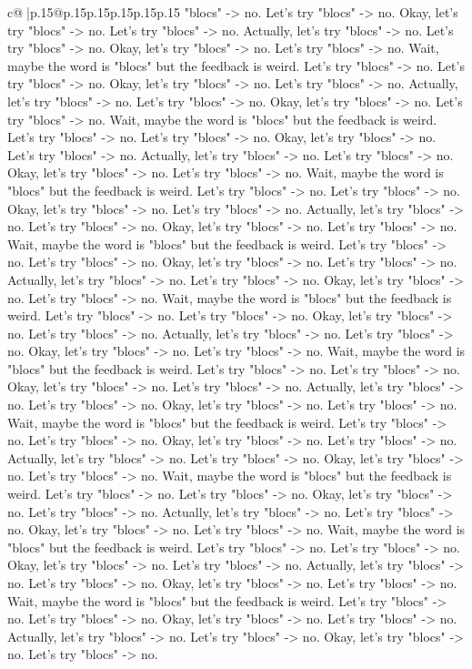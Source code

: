 \documentclass{article}
\begin{document}
{\begin{supertabular}{c@{$\;$}|p{.15\linewidth}@{}p{.15\linewidth}p{.15\linewidth}p{.15\linewidth}p{.15\linewidth}p{.15\linewidth}}
{{{"blocs" {-}> no. Let's try "blocs" {-}> no. Okay, let's try "blocs" {-}> no. Let's try "blocs" {-}> no. Actually, let's try "blocs" {-}> no. Let's try "blocs" {-}> no. Okay, let's try "blocs" {-}> no. Let's try "blocs" {-}> no. Wait, maybe the word is "blocs" but the feedback is weird. Let's try "blocs" {-}> no. Let's try "blocs" {-}> no. Okay, let's try "blocs" {-}> no. Let's try "blocs" {-}> no. Actually, let's try "blocs" {-}> no. Let's try "blocs" {-}> no. Okay, let's try "blocs" {-}> no. Let's try "blocs" {-}> no. Wait, maybe the word is "blocs" but the feedback is weird. Let's try "blocs" {-}> no. Let's try "blocs" {-}> no. Okay, let's try "blocs" {-}> no. Let's try "blocs" {-}> no. Actually, let's try "blocs" {-}> no. Let's try "blocs" {-}> no. Okay, let's try "blocs" {-}> no. Let's try "blocs" {-}> no. Wait, maybe the word is "blocs" but the feedback is weird. Let's try "blocs" {-}> no. Let's try "blocs" {-}> no. Okay, let's try "blocs" {-}> no. Let's try "blocs" {-}> no. Actually, let's try "blocs" {-}> no. Let's try "blocs" {-}> no. Okay, let's try "blocs" {-}> no. Let's try "blocs" {-}> no. Wait, maybe the word is "blocs" but the feedback is weird. Let's try "blocs" {-}> no. Let's try "blocs" {-}> no. Okay, let's try "blocs" {-}> no. Let's try "blocs" {-}> no. Actually, let's try "blocs" {-}> no. Let's try "blocs" {-}> no. Okay, let's try "blocs" {-}> no. Let's try "blocs" {-}> no. Wait, maybe the word is "blocs" but the feedback is weird. Let's try "blocs" {-}> no. Let's try "blocs" {-}> no. Okay, let's try "blocs" {-}> no. Let's try "blocs" {-}> no. Actually, let's try "blocs" {-}> no. Let's try "blocs" {-}> no. Okay, let's try "blocs" {-}> no. Let's try "blocs" {-}> no. Wait, maybe the word is "blocs" but the feedback is weird. Let's try "blocs" {-}> no. Let's try "blocs" {-}> no. Okay, let's try "blocs" {-}> no. Let's try "blocs" {-}> no. Actually, let's try "blocs" {-}> no. Let's try "blocs" {-}> no. Okay, let's try "blocs" {-}> no. Let's try "blocs" {-}> no. Wait, maybe the word is "blocs" but the feedback is weird. Let's try "blocs" {-}> no. Let's try "blocs" {-}> no. Okay, let's try "blocs" {-}> no. Let's try "blocs" {-}> no. Actually, let's try "blocs" {-}> no. Let's try "blocs" {-}> no. Okay, let's try "blocs" {-}> no. Let's try "blocs" {-}> no. Wait, maybe the word is "blocs" but the feedback is weird. Let's try "blocs" {-}> no. Let's try "blocs" {-}> no. Okay, let's try "blocs" {-}> no. Let's try "blocs" {-}> no. Actually, let's try "blocs" {-}> no. Let's try "blocs" {-}> no. Okay, let's try "blocs" {-}> no. Let's try "blocs" {-}> no. Wait, maybe the word is "blocs" but the feedback is weird. Let's try "blocs" {-}> no. Let's try "blocs" {-}> no. Okay, let's try "blocs" {-}> no. Let's try "blocs" {-}> no. Actually, let's try "blocs" {-}> no. Let's try "blocs" {-}> no. Okay, let's try "blocs" {-}> no. Let's try "blocs" {-}> no. Wait, maybe the word is "blocs" but the feedback is weird. Let's try "blocs" {-}> no. Let's try "blocs" {-}> no. Okay, let's try "blocs" {-}> no. Let's try "blocs" {-}> no. Actually, let's try "blocs" {-}> no. Let's try "blocs" {-}> no. Okay, let's try "blocs" {-}> no. Let's try "blocs" {-}> no. }}}
\end{supertabular}}
\end{document}
